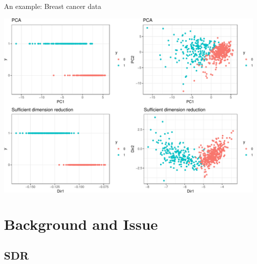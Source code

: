 \documentclass[ignorenonframetext,]{beamer}
\begin{document}
\begin{frame}{An example: Breast cancer data}

\begin{center}\includegraphics{SDR_reps_slides_final_merck_files/figure-beamer/unnamed-chunk-2-1} \end{center}

\end{frame}

\section{Background and Issue}\label{background-and-issue}

\subsection{SDR}\label{sdr}
\end{document}
